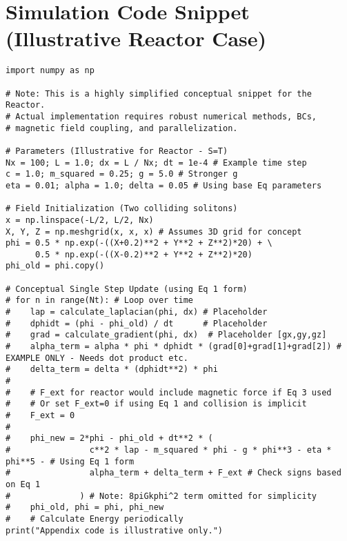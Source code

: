 \documentclass[11pt]{article}
\begin{document}
\appendix
\section{Simulation Code Snippet (Illustrative Reactor Case)}
\begin{lstlisting}
import numpy as np

# Note: This is a highly simplified conceptual snippet for the Reactor.
# Actual implementation requires robust numerical methods, BCs,
# magnetic field coupling, and parallelization.

# Parameters (Illustrative for Reactor - S=T)
Nx = 100; L = 1.0; dx = L / Nx; dt = 1e-4 # Example time step
c = 1.0; m_squared = 0.25; g = 5.0 # Stronger g
eta = 0.01; alpha = 1.0; delta = 0.05 # Using base Eq parameters

# Field Initialization (Two colliding solitons)
x = np.linspace(-L/2, L/2, Nx)
X, Y, Z = np.meshgrid(x, x, x) # Assumes 3D grid for concept
phi = 0.5 * np.exp(-((X+0.2)**2 + Y**2 + Z**2)*20) + \
      0.5 * np.exp(-((X-0.2)**2 + Y**2 + Z**2)*20)
phi_old = phi.copy()

# Conceptual Single Step Update (using Eq 1 form)
# for n in range(Nt): # Loop over time
#    lap = calculate_laplacian(phi, dx) # Placeholder
#    dphidt = (phi - phi_old) / dt      # Placeholder
#    grad = calculate_gradient(phi, dx)  # Placeholder [gx,gy,gz]
#    alpha_term = alpha * phi * dphidt * (grad[0]+grad[1]+grad[2]) # EXAMPLE ONLY - Needs dot product etc.
#    delta_term = delta * (dphidt**2) * phi
#
#    # F_ext for reactor would include magnetic force if Eq 3 used
#    # Or set F_ext=0 if using Eq 1 and collision is implicit
#    F_ext = 0
#
#    phi_new = 2*phi - phi_old + dt**2 * (
#                c**2 * lap - m_squared * phi - g * phi**3 - eta * phi**5 - # Using Eq 1 form
#                alpha_term + delta_term + F_ext # Check signs based on Eq 1
#              ) # Note: 8piGkphi^2 term omitted for simplicity
#    phi_old, phi = phi, phi_new
#    # Calculate Energy periodically
print("Appendix code is illustrative only.")

\end{lstlisting}


\end{document}
